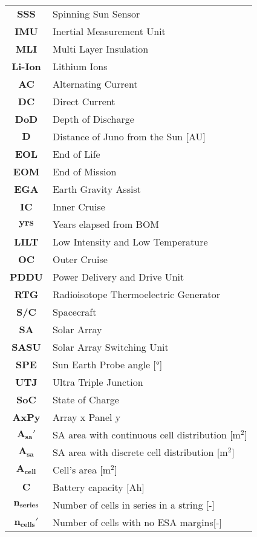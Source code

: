 \begin{multicols}{2}
{\begin{xltabular}{\linewidth}{c>{\raggedright\arraybackslash}X}
		\textbf{SSS} & Spinning Sun Sensor \\
		\textbf{IMU} & Inertial Measurement Unit \\
		\textbf{MLI} & Multi Layer Insulation \\
		\textbf{Li-Ion} & Lithium Ions \\
		\textbf{AC} & Alternating Current \\
		\textbf{DC} & Direct Current \\
		\textbf{DoD} & Depth of Discharge \\ 
		$\boldsymbol{D}$ & Distance of Juno from the Sun [AU] \\ 
		\textbf{EOL} & End of Life \\ 
		\textbf{EOM} & End of Mission \\ 
		\textbf{EGA} & Earth Gravity Assist \\ 
		\textbf{IC} & Inner Cruise \\
		$\boldsymbol{yrs}$ & Years elapsed from BOM \\
		\textbf{LILT} & Low Intensity and Low Temperature \\ 
		\textbf{OC} & Outer Cruise \\
		\textbf{PDDU} & Power Delivery and Drive Unit \\ 
		\textbf{RTG} & Radioisotope Thermoelectric Generator \\ 
		\textbf{S/C} & Spacecraft \\ 
		\textbf{SA} & Solar Array \\
		\textbf{SASU} & Solar Array Switching Unit \\ 
		\textbf{SPE} & Sun Earth Probe angle [°] \\ 
		\textbf{UTJ} & Ultra Triple Junction \\  
		\textbf{SoC} & State of Charge \\
		\textbf{AxPy} & Array x Panel y\\
		$\boldsymbol{A_{sa}'}$ & SA area with continuous cell distribution [$\textrm{m}^2$] \\
		$\boldsymbol{A_{sa}}$ & SA area with discrete cell distribution [$\textrm{m}^2$] \\
		$\boldsymbol{A_{cell}}$ & Cell's area [$\textrm{m}^2$] \\
		$\boldsymbol{C}$ & Battery capacity [Ah] \\
		$\boldsymbol{n_{series}}$ & Number of cells in series in a string [-] \\
		$\boldsymbol{n_{cells}'}$ & Number of cells with no ESA margins[-] \\

\end{xltabular}}
\end{multicols}
